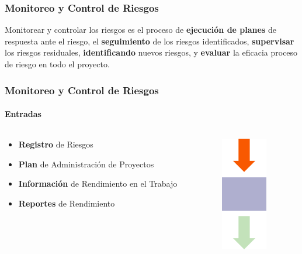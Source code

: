 \frame
{
\frametitle{Monitoreo y Control de Riesgos}

\begin{block}{}
Monitorear y controlar los riesgos es el proceso de \textbf{ejecución de planes} de respuesta ante el riesgo, el \textbf{seguimiento} de los riesgos identificados, \textbf{supervisar} los riesgos residuales, \textbf{identificando} nuevos riesgos, y \textbf{evaluar} la eficacia proceso de riesgo en todo el proyecto.
\end{block}

}

\frame
{
\frametitle{Monitoreo y Control de Riesgos}
\framesubtitle{Entradas}
\begin{columns}
	\begin{column}{0.8\textwidth}
		\begin{itemize}
			\item <1-> \textbf{Registro} de Riesgos
			\item <2-> \textbf{Plan} de Administración de Proyectos
			\item <3-> \textbf{Información} de Rendimiento en el Trabajo
			\item <4-> \textbf{Reportes} de Rendimiento
		\end{itemize}
	\end{column}
	\begin{column}{0.2\textwidth}
		\includegraphics[width=2cm]{img/input}
	\end{column}
\end{columns}
}

